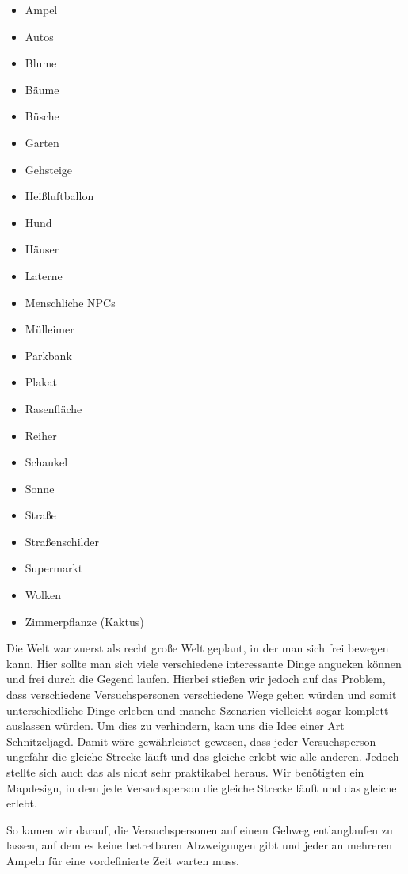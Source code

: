 \documentclass{Bericht}
\begin{document}
		\begin{itemize}
			\setlength{\itemsep}{0em}
			\item Ampel
			\item Autos
			\item Blume
			\item Bäume
			\item Büsche
			\item Garten
			\item Gehsteige
			\item Heißluftballon
			\item Hund
			\item Häuser
			\item Laterne
			\item Menschliche NPCs
			\item Mülleimer
			\item Parkbank
			\item Plakat
			\item Rasenfläche
			\item Reiher
			\item Schaukel
			\item Sonne
			\item Straße
			\item Straßenschilder
			\item Supermarkt
			\item Wolken
			\item Zimmerpflanze (Kaktus)
		\end{itemize}

		Die Welt war zuerst als recht große Welt geplant, in der man sich frei bewegen kann. Hier sollte man sich viele verschiedene interessante Dinge angucken können und frei durch die Gegend laufen. Hierbei stießen wir jedoch auf das Problem, dass verschiedene Versuchspersonen verschiedene Wege gehen würden und somit unterschiedliche Dinge erleben und manche Szenarien vielleicht sogar komplett auslassen würden. Um dies zu verhindern, kam uns die Idee einer Art Schnitzeljagd. Damit wäre gewährleistet gewesen, dass jeder Versuchsperson ungefähr die gleiche Strecke läuft und das gleiche erlebt wie alle anderen. Jedoch stellte sich auch das als nicht sehr praktikabel heraus. Wir benötigten ein Mapdesign, in dem jede Versuchsperson die gleiche Strecke läuft und das gleiche erlebt.

		So kamen wir darauf, die Versuchspersonen auf einem Gehweg entlanglaufen zu lassen, auf dem es keine betretbaren Abzweigungen gibt und jeder an mehreren Ampeln für eine vordefinierte Zeit warten muss. 
		
\end{document}
